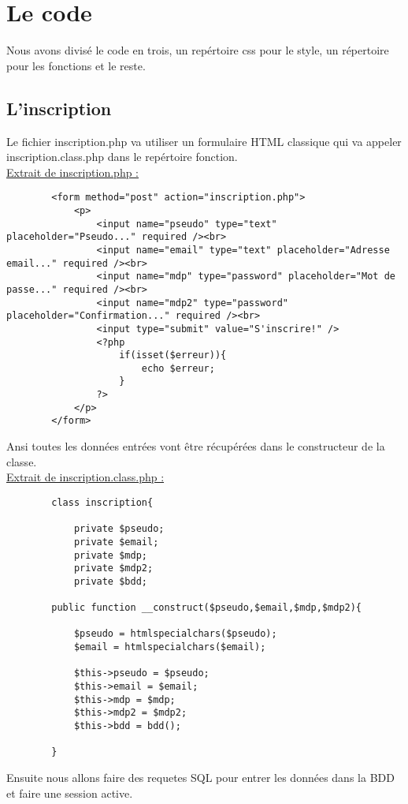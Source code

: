 \documentclass{article}
\begin{document}
    \section{Le code}
    Nous avons divisé le code en trois, un repértoire css pour le style, un répertoire pour les fonctions et le reste. 
    \subsection{L'inscription}
    Le fichier inscription.php va utiliser un formulaire HTML classique qui va appeler inscription.class.php dans le repértoire fonction. \\
    \underline{Extrait de inscription.php :} 
    \begin{lstlisting}
        <form method="post" action="inscription.php">
            <p>
                <input name="pseudo" type="text" placeholder="Pseudo..." required /><br>
                <input name="email" type="text" placeholder="Adresse email..." required /><br>
                <input name="mdp" type="password" placeholder="Mot de passe..." required /><br>
                <input name="mdp2" type="password" placeholder="Confirmation..." required /><br>
                <input type="submit" value="S'inscrire!" />
                <?php 
                    if(isset($erreur)){
                        echo $erreur;
                    }
                ?>
            </p>
        </form>
    \end{lstlisting}
    Ansi toutes les données entrées vont être récupérées dans le constructeur de la classe. \\
    \underline{Extrait de inscription.class.php :}
    \begin{lstlisting}
        class inscription{
    
            private $pseudo;
            private $email;
            private $mdp;
            private $mdp2;
            private $bdd;
    
        public function __construct($pseudo,$email,$mdp,$mdp2){
    
            $pseudo = htmlspecialchars($pseudo);
            $email = htmlspecialchars($email);
        
            $this->pseudo = $pseudo; 
            $this->email = $email;
            $this->mdp = $mdp;
            $this->mdp2 = $mdp2;
            $this->bdd = bdd();
        
        }
    \end{lstlisting}
    Ensuite nous allons faire des requetes SQL pour entrer les données dans la BDD et faire une session active. 
\end{document}
